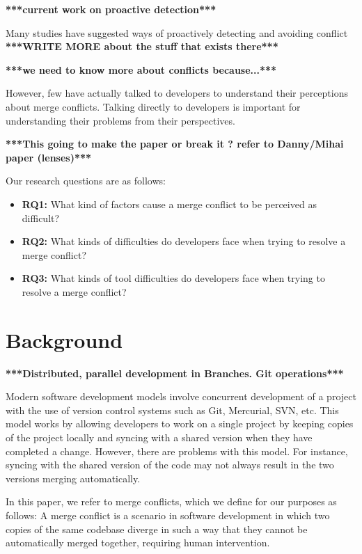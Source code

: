 \documentclass[conference]{IEEEtran}
\begin{document}
\textbf{***current work on proactive detection***}

Many studies have suggested ways of proactively detecting and avoiding conflict \cite{Brun2011} \cite{palantir} \textbf{***WRITE MORE about the stuff that exists there***}

\textbf{***we need to know more about conflicts because...***}

However, few have actually talked to developers to understand their perceptions about merge conflicts. Talking directly to developers is important for understanding their problems from their perspectives. 

\textbf{***This going to make the paper or break it ? refer to Danny/Mihai paper (lenses)***}

Our research questions are as follows:
\begin{itemize}
\item\textbf{RQ1:} What kind of factors cause a merge conflict to be perceived as difficult?\\
\item\textbf{RQ2:} What kinds of difficulties do developers face when trying to resolve a merge conflict?\\
\item\textbf{RQ3:} What kinds of tool difficulties do developers face when trying to resolve a merge conflict?\\
\end{itemize}

\section{Background}

\textbf{***Distributed, parallel development in Branches. Git operations***}

Modern software development models involve concurrent development of a project with the use of version control systems such as Git, Mercurial, SVN, etc. This model works by allowing developers to work on a single project by keeping copies of the project locally and syncing with a shared version when they have completed a change. However, there are problems with this model. For instance, syncing with the shared version of the code may not always result in the two versions merging automatically.

In this paper, we refer to merge conflicts, which we define for our purposes as follows:
A merge conflict is a scenario in software development in which two copies of the same codebase diverge in such a way that they cannot be automatically merged together, requiring human intervention. 
\end{document}
